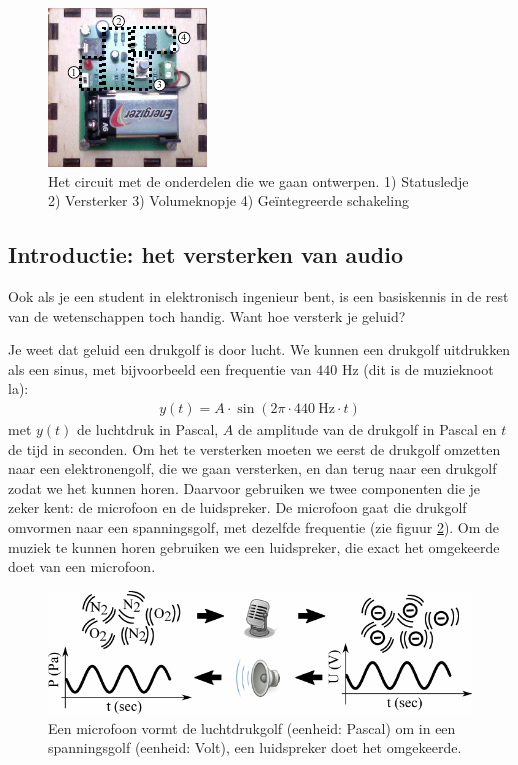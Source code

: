 \documentclass{article}
\begin{document}
		\begin{figure}[htbp]
				\centering
				\includegraphics[scale=3]{pcb}
				\caption{Het circuit met de onderdelen die we gaan ontwerpen. 1) Statusledje 2) Versterker 3) Volumeknopje 4) Ge\"integreerde schakeling}
				\label{fig:pcb}
			\end{figure}

		\subsection{Introductie: het versterken van audio}

			Ook als je een student in elektronisch ingenieur bent, is een basiskennis in de rest van de wetenschappen toch handig. Want hoe versterk je geluid?

			Je weet dat geluid een drukgolf is door lucht. We kunnen een drukgolf uitdrukken als een sinus, met bijvoorbeeld een frequentie van $440$ Hz (dit is de muzieknoot la):
			\begin{align}
				y(t) = A \cdot \sin (2\pi \cdot 440~\text{Hz} \cdot t)
			\end{align}
			met $y(t)$ de luchtdruk in Pascal, $A$ de amplitude van de drukgolf in Pascal en $t$ de tijd in seconden.
			Om het te versterken moeten we eerst de drukgolf omzetten naar een elektronengolf, die we gaan versterken, en dan terug naar een drukgolf zodat we het kunnen horen. Daarvoor gebruiken we twee componenten die je zeker kent: de microfoon en de luidspreker.
			De microfoon gaat die drukgolf omvormen naar een spanningsgolf, met dezelfde frequentie (zie figuur \ref{fig:micro}). Om de muziek te kunnen horen gebruiken we een luidspreker, die exact het omgekeerde doet van een microfoon. 

			\begin{figure}[htbp]
				\centering
				\includegraphics[scale=1.2]{micro}
				\caption{Een microfoon vormt de luchtdrukgolf (eenheid: Pascal) om in een spanningsgolf (eenheid: Volt), een luidspreker doet het omgekeerde.}
				\label{fig:micro}
			\end{figure}
\end{document}
